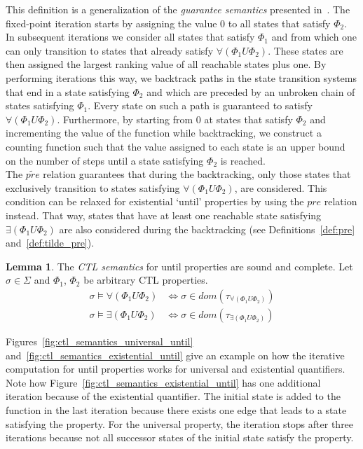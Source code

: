 \documentclass[11pt,a4paper,titlepage]{article}
\theoremstyle{definition}
\newtheorem{lemma}[theorem]{Lemma}
\begin{document}
This definition is a generalization of the \textit{guarantee semantics} presented in~\cite{UrbanM-VMCAI15}. 
The fixed-point iteration starts by assigning the value $0$ to all states that satisfy $\Phi_2$. 
In subsequent iterations we consider all states that satisfy $\Phi_1$ and from which one can only transition to states that already satisfy  
$\forall(\Phi_1 U \Phi_2)$. These states are then assigned the largest ranking value of all reachable states plus one. 
By performing iterations this way, we backtrack paths in the state transition systems that end in a state satisfying $\Phi_2$ and which are preceded by an 
unbroken chain of states satisfying $\Phi_1$. Every state on such a path is guaranteed to satisfy $\forall(\Phi_1 U \Phi_2)$. 
Furthermore, by starting from $0$ at states that satisfy $\Phi_2$ and incrementing the value of the function while backtracking, 
we construct a counting function such that the value assigned to each state is an 
upper bound on the number of steps until a state satisfying $\Phi_2$ is reached.\\

The $\widetilde{pre}$ relation guarantees that during the backtracking, only those states that
exclusively transition to states satisfying $\forall(\Phi_1 U \Phi_2)$, are considered. 
This condition can be relaxed for existential `until' properties by using the $pre$ relation instead. 
That way, states that have at least one reachable state satisfying $\exists(\Phi_1 U \Phi_2)$ are also considered 
during the backtracking (see Definitions~\ref{def:pre} and~\ref{def:tilde_pre}).\\

\begin{lemma}\label{lem:ctl_semantics_until}
    The \textit{CTL semantics} for \textsf{until} properties are sound and complete. 
    Let $\sigma \in \Sigma$ and $\Phi_1$, $\Phi_2$ be arbitrary CTL properties.
    \begin{align}
        \sigma \models \forall(\Phi_1 U \Phi_2) &\iff \sigma \in dom(\tau_{\forall(\Phi_1 U \Phi_2)})\\
        \sigma \models \exists(\Phi_1 U \Phi_2) &\iff \sigma \in dom(\tau_{\exists(\Phi_1 U \Phi_2)})
    \end{align}
\end{lemma}


Figures~\ref{fig:ctl_semantics_universal_until} and~\ref{fig:ctl_semantics_existential_until} give an example on how the
iterative computation for \textsf{until} properties works for universal and existential quantifiers. 
Note how Figure~\ref{fig:ctl_semantics_existential_until} has one additional iteration because of the existential quantifier. 
The initial state is added to the function in the last iteration because there exists one edge that leads to a state satisfying the property.  
For the universal property, the iteration stops after three iterations because not all successor states
of the initial state satisfy the property.
\end{document}
